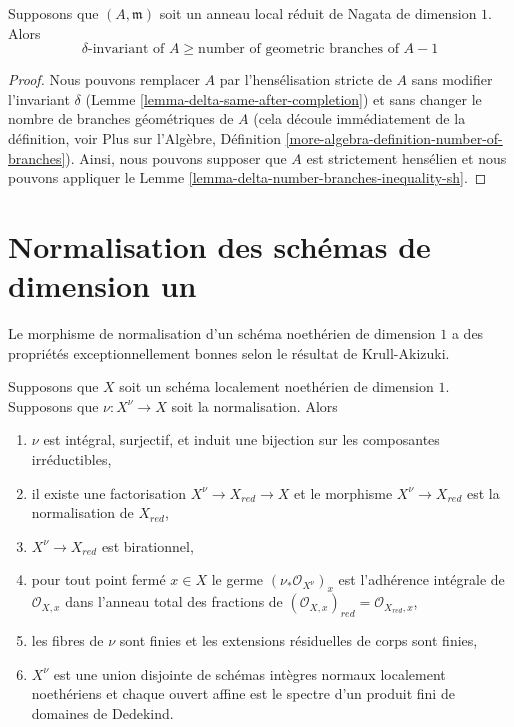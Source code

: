 \begin{lemma}
\label{lemma-delta-number-branches-inequality}
Supposons que $(A, \mathfrak m)$ soit un anneau local réduit de Nagata de dimension $1$. Alors
$$
\delta\text{-invariant of }A \geq \text{number of geometric branches of }A - 1
$$
\end{lemma}

\begin{proof}
Nous pouvons remplacer $A$ par l'hensélisation stricte de
$A$ sans modifier l'invariant $\delta$ (Lemme
\ref{lemma-delta-same-after-completion}) et sans changer le
nombre de branches géométriques de $A$ (cela découle
immédiatement de la définition, voir Plus sur l'Algèbre,
Définition \ref{more-algebra-definition-number-of-branches}). Ainsi,
nous pouvons supposer que $A$ est strictement hensélien et nous
pouvons appliquer le Lemme \ref{lemma-delta-number-branches-inequality-sh}.
\end{proof}






\section{Normalisation des schémas de dimension un}
\label{section-normalization-one-dimensional}

\noindent
Le morphisme de normalisation d’un schéma noethérien de dimension $1$ a
des propriétés exceptionnellement bonnes selon le résultat de Krull-Akizuki.

\begin{lemma}
\label{lemma-normalize-noetherian-dim-1}
Supposons que $X$ soit un schéma localement noethérien de dimension
$1$. Supposons que $\nu : X^\nu \to X$ soit la normalisation. Alors
\begin{enumerate}
\item $\nu$ est intégral, surjectif, et induit une
bijection sur les composantes irréductibles, \item
il existe une factorisation $X^\nu \to X_{red} \to
X$ et le morphisme $X^\nu \to X_{red}$ est la
normalisation de $X_{red}$, \item $X^\nu \to
X_{red}$ est birationnel, \item pour tout point
fermé $x \in X$ le germe
$(\nu_*\mathcal{O}_{X^\nu})_x$ est l'adhérence
intégrale de $\mathcal{O}_{X, x}$ dans l'anneau total
des fractions de $(\mathcal{O}_{X, x})_{red} =
\mathcal{O}_{X_{red}, x}$, \item les fibres de $\nu$ sont
finies et les extensions résiduelles de corps sont
finies, \item $X^\nu$ est une union disjointe de schémas
intègres normaux localement noethériens et chaque ouvert
affine est le spectre d'un produit fini de domaines de Dedekind.
\end{enumerate}
\end{lemma}

